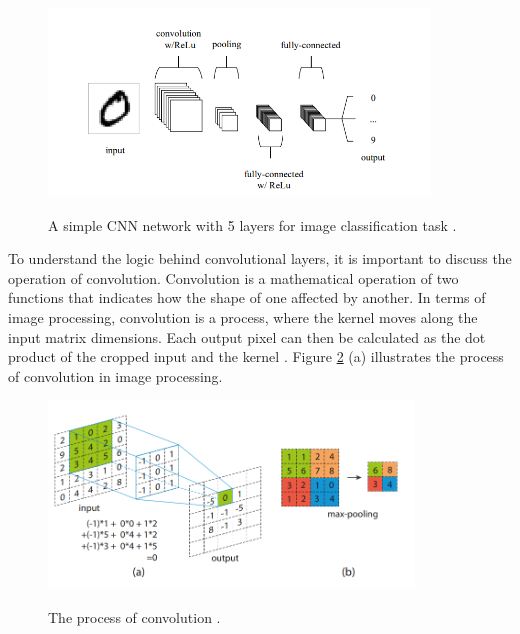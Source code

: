 \begin{figure}[htb]
	\begin{center}
		\includegraphics[height=5cm]{./CNN.png}
	\end{center}
	\caption{A simple CNN network with 5 layers for image classification task \cite{Mahony2019}.}
	\begin{center}
		\label{CNN}
	\end{center}
\end{figure}
\FloatBarrier

To understand the logic behind convolutional layers, it is important to discuss the operation of convolution. Convolution is a mathematical operation of two functions that indicates how the shape of one affected by another. In terms of image processing, convolution is a process, where the kernel moves along the input matrix dimensions. Each output pixel can then be calculated as the dot product of the cropped input and the kernel \cite{Liu2016}. Figure \ref{CNN_1} (a) illustrates the process of convolution in image processing.  
\begin{figure}[htb]
	\begin{center}
		\includegraphics[height=5cm]{./CNN_1.png}
	\end{center}
	\caption{The process of convolution \cite{Liu2016}.}
	\begin{center}
		\label{CNN_1}
	\end{center}
\end{figure}
\FloatBarrier

